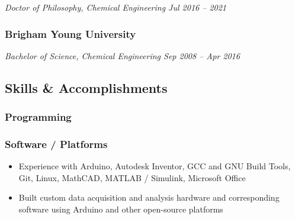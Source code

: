 \emph{Doctor of Philosophy, Chemical Engineering \textbar{} Jul 2016 --
2021}

\hypertarget{brigham-young-university-1}{%
\subsubsection{Brigham Young
University}\label{brigham-young-university-1}}

\emph{Bachelor of Science, Chemical Engineering \textbar{} Sep 2008 --
Apr 2016}

\hypertarget{skills-accomplishments}{%
\subsection{Skills \& Accomplishments}\label{skills-accomplishments}}

\hypertarget{programming}{%
\subsubsection{Programming}\label{programming}}


\hypertarget{software-platforms}{%
\subsubsection{Software / Platforms}\label{software-platforms}}

\begin{itemize}
\tightlist
\item
  Experience with Arduino, Autodesk Inventor, GCC and GNU Build Tools,
  Git, Linux, MathCAD, MATLAB / Simulink, Microsoft Office
\item
  Built custom data acquisition and analysis hardware and corresponding
  software using Arduino and other open-source platforms
\end{itemize}

